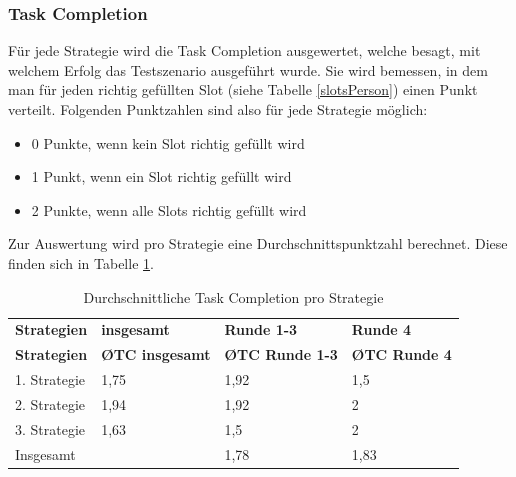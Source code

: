 \documentclass[12pt,a4paper]{scrartcl}
\begin{document}
\subsubsection{Task Completion}
\label{tcausw1}
Für jede Strategie wird die Task Completion ausgewertet, welche besagt, mit welchem Erfolg das Testszenario ausgeführt wurde. Sie wird bemessen, in dem man für jeden richtig gefüllten Slot (siehe Tabelle \ref{slotsPerson}) einen Punkt verteilt. Folgenden Punktzahlen sind also für jede Strategie möglich:
\begin{itemize}
\item 0 Punkte, wenn kein Slot richtig gefüllt wird
\item 1 Punkt, wenn ein Slot richtig gefüllt wird
\item 2 Punkte, wenn alle Slots richtig gefüllt wird
\end{itemize}
Zur Auswertung wird pro Strategie eine Durchschnittspunktzahl berechnet. 
Diese finden sich in Tabelle \ref{TCV1}.

\begin{longtable}{p{3cm}p{3cm}p{3cm}p{3cm} }
	\label{TCV1}\\
	\caption[Durchschnittliche Task Completion pro Strategie]{Durchschnittliche Task Completion pro Strategie}\\
	\hline
\textbf{Strategien}&\textbf{insgesamt}&\textbf{Runde 1-3} &\textbf{Runde 4}\\
	\hline
	\endfirsthead
	\hline
	\textbf{Strategien}&\textbf{\O TC insgesamt}&\textbf{\O TC Runde 1-3} &\textbf{\O TC Runde 4}\\
	\hline
	\endhead
1. Strategie & 1,75 & 1,92 & 1,5  \\
2. Strategie & 1,94 & 1,92 & 2  \\
3. Strategie & 1,63 & 1,5 & 2  \\
\hline
Insgesamt & & 1,78 & 1,83 \\ 
\hline
\end{longtable}
\end{document}
